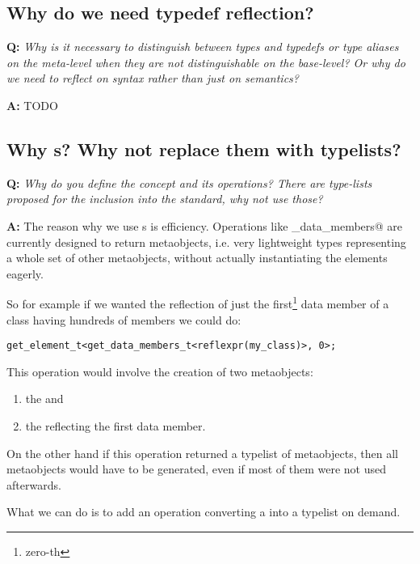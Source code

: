 \subsection{Why do we need typedef reflection?}

\textbf{Q:} {\em Why is it necessary to distinguish between types and typedefs
or type aliases on the meta-level when they are not distinguishable on the
base-level? Or why do we need to reflect on syntax rather than just on semantics?}

\textbf{A:}
TODO

\subsection{Why s? Why not replace them with typelists?}

\textbf{Q:} {\em Why do you define the  concept and its
operations? There are type-lists proposed for the inclusion into the standard,
why not use those?}

\textbf{A:} The reason why we use s is efficiency.
Operations like \verb@get_data_members@ are currently designed to return
metaobjects, i.e.  very lightweight types representing a whole set of
other metaobjects, without actually instantiating the elements eagerly.

So for example if we wanted the reflection of just the first\footnote
{zero-th} data member of a class having hundreds of members we could do:

\begin{verbatim}
get_element_t<get_data_members_t<reflexpr(my_class)>, 0>;
\end{verbatim}

This operation would involve the creation of two metaobjects:
\begin{enumerate}
	\item the  and
	\item the  reflecting the first data member.
\end{enumerate}

On the other hand if this operation returned a typelist of metaobjects,
then all metaobjects would have to be generated, even if most of them
were not used afterwards.

What we can do is to add an operation converting a 
into a typelist on demand.

